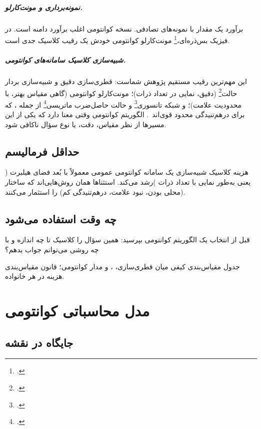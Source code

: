 \paragraph{نمونه‌برداری و مونت‌کارلو.}
برآورد یک مقدار با نمونه‌های تصادفی. نسخه کوانتومی اغلب برآورد دامنه است. در فیزیک بس‌ذره‌ای،\footnote{.} مونت‌کارلو کوانتومی خودش یک رقیب کلاسیک جدی است.

\paragraph{شبیه‌سازی کلاسیک سامانه‌های کوانتومی.}
این مهم‌ترین رقیب مستقیم پژوهش شماست: قطری‌سازی دقیق و شبیه‌سازی بردار حالت\footnote{.} (دقیق، نمایی در تعداد ذرات)؛ مونت‌کارلو کوانتومی (گاهی مقیاس بهتر، با محدودیت علامت)؛ و شبکه تانسوری\footnote{.} و حالت حاصل‌ضرب ماتریسی\footnote{.} از جمله ، که برای درهم‌تنیدگی محدود قوی‌اند~\cite{Verstraete2008,Cirac2021}. الگوریتم کوانتومی وقتی معنا دارد که یکی از این مسیرها از نظر مقیاس، دقت، یا نوع سؤال ناکافی شود.

\section{حداقل فرمالیسم}

هزینه کلاسیک شبیه‌سازی یک سامانه کوانتومی عمومی معمولاً با بُعد فضای هیلبرت ( یعنی به‌طور نمایی با تعداد ذرات )رشد می‌کند. استثناها همان روش‌هایی‌اند که ساختار (محلی بودن، نبود علامت، درهم‌تنیدگی کم) را استثمار می‌کنند.


\section{چه وقت استفاده می‌شود}

قبل از انتخاب یک الگوریتم کوانتومی بپرسید: همین سؤال را کلاسیک تا چه اندازه و با چه روشی می‌توانم جواب بدهم؟

\begin{remark}
جدول مقیاس‌بندی کیفی میان قطری‌سازی، ،  و مدار کوانتومی؛ قانون مقیاس‌بندی هزینه در هر خانواده.
\end{remark}

\chapter{مدل محاسباتی کوانتومی}
\label{chap:qmodel}

\section{جایگاه در نقشه}

